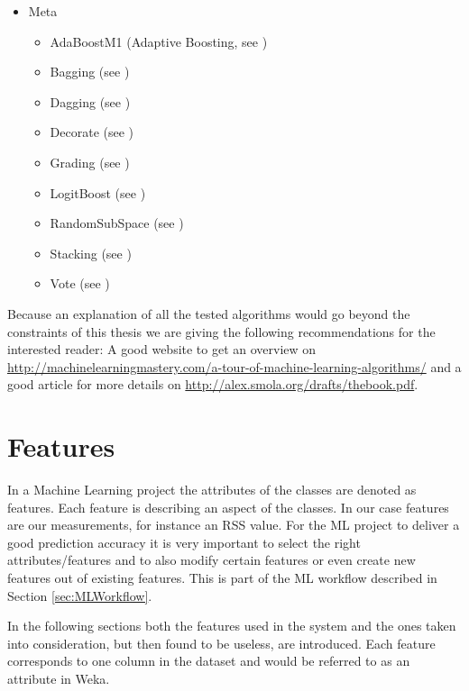 \begin{itemize}
   \item Meta
   \begin{itemize}
     \item AdaBoostM1 (Adaptive Boosting, see \cite{Freund1996})
     \item Bagging (see \cite{Breiman1996})
     \item Dagging (see \cite{Ting1997})
     \item Decorate (see \cite{Melville2003, Melville2004})
     \item Grading (see \cite{Seewald2001})
     \item LogitBoost (see \cite{Friedman1998})
     \item RandomSubSpace (see \cite{Ho1998})
     \item Stacking (see \cite{Wolpert1992})
     \item Vote (see \cite{Kuncheva2004, Kittler1998})
   \end{itemize}
\end{itemize}

Because an explanation of all the tested algorithms would go beyond the constraints of this thesis we are giving the following recommendations for the interested reader: A good website to get an overview on \url{http://machinelearningmastery.com/a-tour-of-machine-learning-algorithms/} and a good article for more details on \url{http://alex.smola.org/drafts/thebook.pdf}.



\section{Features}
\label{sec:Features}
In a Machine Learning project the attributes of the classes are denoted as features. Each feature is describing an aspect of the classes. In our case features are our measurements, for instance an RSS value. For the ML project to deliver a good prediction accuracy it is very important to select the right attributes/features and to also modify certain features or even create new features out of existing features. This is part of the ML workflow described in Section \ref{sec:MLWorkflow}.

In the following sections both the features used in the system and the ones taken into consideration, but then found to be useless, are introduced. Each feature corresponds to one column in the dataset and would be referred to as an attribute in Weka.

